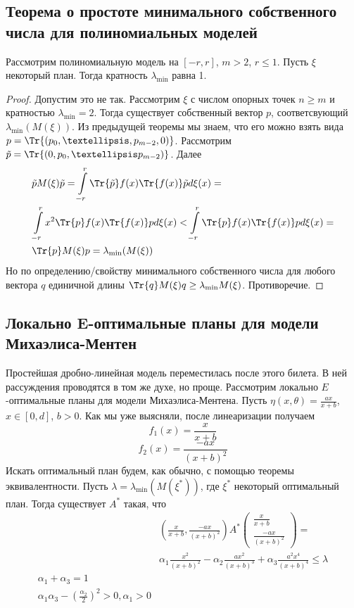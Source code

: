  \subsection{Теорема о простоте минимального собственного числа для полиномиальных моделей}
 \begin{thm}
Рассмотрим полиномиальную модель на  $[-r,r]$, $m > 2$, $r \leq 1$. Пусть $\xi$ некоторый план. Тогда кратность $\lambda_{\min}$ равна 1.
 \end{thm}
\begin{proof}
Допустим это не так. Рассмотрим $\xi$ с числом опорных точек $n \geq m$ и кратностью $\lambda_{\min} = 2$. Тогда 
существует собственный вектор $p$, соответсвующий $\lambda_{\min}(M(\xi))$. Из предыдущей теоремы мы знаем, что его можно взять вида $p = \Tr{(p_0, …, p_{m-2}, 0)}$. Рассмотрим $\tilde{p} = \Tr{(0, p_0,…p_{m-2})}$. Далее
\begin{equation}
\begin{split}
&\tilde{p}M(\xi)\tilde{p} = \int\limits_{-r}^r \Tr{\tilde{p}} f(x) \Tr{f(x)} \tilde{p}d\xi(x) = \\
&\int\limits_{-r}^r x^2 \Tr{p} f(x)\Tr{f(x)} p d\xi(x) < \int  \limits_{-r}^r  \Tr{p} f(x)\Tr{f(x)} p d\xi(x)= \\
&\Tr{p}M(\xi)p = \lambda_{\min}(M(\xi))
 \end{split}
 \end{equation}
 Но по определению/свойству минимального собственного числа для любого вектора $q$ единичной длины
 $\Tr{q} M(\xi)q \geq \lambda_{\min}M(\xi)$. Противоречие.
\end{proof}


\subsection{Локально E-оптимальные планы для модели Михаэлиса-Ментен}
{\color{blue} Простейшая дробно-линейная модель переместилась после этого билета. В ней рассуждения проводятся в том же духе, но проще. }
Рассмотрим локально $E$-оптимальные планы для модели Михаэлиса-Ментена. Пусть 
$\eta(x, \theta) = \frac{ax}{x+b}$, $x\in[0,d]$, $b > 0$. Как мы уже выясняли, после линеаризации получаем
$$f_1(x) = \frac{x}{x+b}$$
$$f_2(x) = \frac{-ax}{(x+b)^2}$$
Искать оптимальный план будем, как обычно, с помощью теоремы эквивалентности. Пусть $\lambda = \lambda_{\min}(M(\xi^{*}))$, где $\xi^{*}$ некоторый оптимальный план. Тогда существует $A^{*}$ такая, что
\begin{equation}
\begin{split}
&(\frac{x}{x+b}, \frac{-ax}{(x+b)^2}) A^{*}\begin{pmatrix} \frac{x}{x+b}\\ \frac{-ax}{(x+b)^2}\end{pmatrix} = \\
& \alpha_1 \frac{x^2}{(x+b)^2} - \alpha_2 \frac{ax^2}{(x+b)^3} + \alpha_3\frac{a^2 x^4}{(x+b)^4} \leq \lambda \\
\alpha_1 + \alpha_3 = 1\\
\alpha_1 \alpha_3 - (\frac{\alpha_2}{2})^2 > 0, \alpha_1 > 0
\end{split}
\end{equation}

